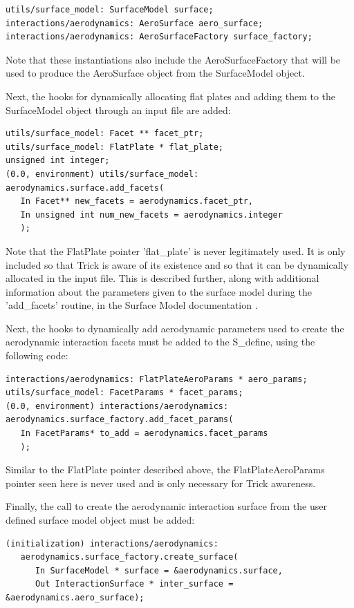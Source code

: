 \begin{verbatim}
utils/surface_model: SurfaceModel surface;
interactions/aerodynamics: AeroSurface aero_surface;
interactions/aerodynamics: AeroSurfaceFactory surface_factory;
\end{verbatim}

Note that these instantiations also include the AeroSurfaceFactory
that will be used to produce the AeroSurface object from the
SurfaceModel object.

Next, the hooks for dynamically allocating flat plates and adding them
to the SurfaceModel object through an input file are added:

\begin{verbatim}
utils/surface_model: Facet ** facet_ptr;
utils/surface_model: FlatPlate * flat_plate;
unsigned int integer;
(0.0, environment) utils/surface_model:
aerodynamics.surface.add_facets(
   In Facet** new_facets = aerodynamics.facet_ptr,
   In unsigned int num_new_facets = aerodynamics.integer
   );
\end{verbatim}

Note that the FlatPlate pointer 'flat\_plate' is never legitimately
used. It is only included so that Trick is aware of its existence
and so that it can be dynamically allocated in the input file. This
is described further, along with additional information
about the parameters given to the surface model during the 'add\_facets'
routine, in the Surface Model documentation
\cite{dynenv:SURFACEMODEL}.

Next, the hooks to dynamically add aerodynamic parameters used to create
the aerodynamic interaction facets must be added to the S\_define,
using the following code:

\begin{verbatim}
interactions/aerodynamics: FlatPlateAeroParams * aero_params;
utils/surface_model: FacetParams * facet_params;
(0.0, environment) interactions/aerodynamics:
aerodynamics.surface_factory.add_facet_params(
   In FacetParams* to_add = aerodynamics.facet_params
   );
\end{verbatim}

Similar to the FlatPlate pointer described above, the FlatPlateAeroParams
pointer seen here is never used and is only necessary for Trick
awareness.

Finally, the call to create the aerodynamic interaction surface from
the user defined surface model object must be added:

\begin{verbatim}
(initialization) interactions/aerodynamics:
   aerodynamics.surface_factory.create_surface(
      In SurfaceModel * surface = &aerodynamics.surface,
      Out InteractionSurface * inter_surface = &aerodynamics.aero_surface);
\end{verbatim}

